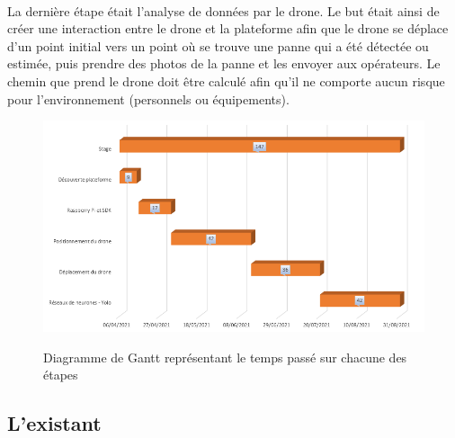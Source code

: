             \paragraph*{}
            La dernière étape était l'analyse de données par le drone. Le but était ainsi de créer une interaction entre le drone et la plateforme afin que le drone se déplace d'un point initial vers un point où se trouve une panne qui a été détectée ou estimée, puis prendre des photos de la panne et les envoyer aux opérateurs. Le chemin que prend le drone doit être calculé afin qu'il ne comporte aucun risque pour l'environnement (personnels ou équipements).
            
            
            \begin{figure}[H]
                \centering
                \begin{frame}{\includegraphics[width=1\textwidth]{image/gantt.png}}
                \end{frame}
                \caption{\label{fig:gantt}Diagramme de Gantt représentant le temps passé sur chacune des étapes}
            \end{figure}
            
        \subsection{L'existant}
